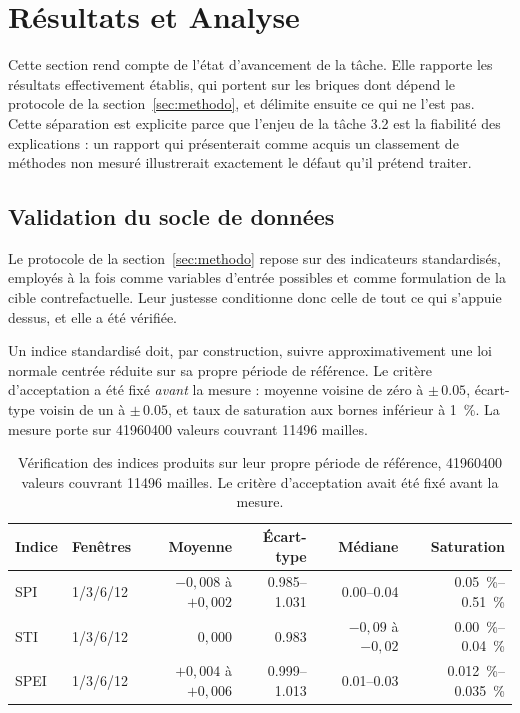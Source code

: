 \newpage
\section{Résultats et Analyse}
\label{sec:benchmark}

Cette section rend compte de l'état d'avancement de la tâche. Elle rapporte les résultats effectivement établis, qui portent sur les briques dont dépend le protocole de la section~\ref{sec:methodo}, et délimite ensuite ce qui ne l'est pas. Cette séparation est explicite parce que l'enjeu de la tâche 3.2 est la fiabilité des explications : un rapport qui présenterait comme acquis un classement de méthodes non mesuré illustrerait exactement le défaut qu'il prétend traiter.

\subsection{Validation du socle de données}
\label{sec:validation-indices}

Le protocole de la section~\ref{sec:methodo} repose sur des indicateurs standardisés, employés à la fois comme variables d'entrée possibles et comme formulation de la cible contrefactuelle. Leur justesse conditionne donc celle de tout ce qui s'appuie dessus, et elle a été vérifiée.

Un indice standardisé doit, par construction, suivre approximativement une loi normale centrée réduite sur sa propre période de référence. Le critère d'acceptation a été fixé \emph{avant} la mesure : moyenne voisine de zéro à $\pm\,\num{0,05}$, écart-type voisin de un à $\pm\,\num{0,05}$, et taux de saturation aux bornes inférieur à \SI{1}{\percent}. La mesure porte sur \num{41960400} valeurs couvrant \num{11496} mailles.

\begin{table}[H]
\centering
\caption{Vérification des indices produits sur leur propre période de référence, \num{41960400} valeurs couvrant \num{11496} mailles. Le critère d'acceptation avait été fixé avant la mesure.}
\label{tab:validation-indices}
\begin{tabularx}{\textwidth}{@{}lXrrrr@{}}
\toprule
\textbf{Indice} & \textbf{Fenêtres} & \textbf{Moyenne} & \textbf{Écart-type} & \textbf{Médiane}
& \textbf{Saturation} \\
\midrule
SPI  & 1/3/6/12 & $-0{,}008$ à $+0{,}002$ & \numrange{0,985}{1,031} & \numrange{0,00}{0,04} & \SIrange{0,05}{0,51}{\percent} \\
STI  & 1/3/6/12 & $0{,}000$               & \num{0,983}            & $-0{,}09$ à $-0{,}02$ & \SIrange{0,00}{0,04}{\percent} \\
SPEI & 1/3/6/12 & $+0{,}004$ à $+0{,}006$ & \numrange{0,999}{1,013} & \numrange{0,01}{0,03} & \SIrange{0,012}{0,035}{\percent} \\
\bottomrule
\end{tabularx}
\end{table}

